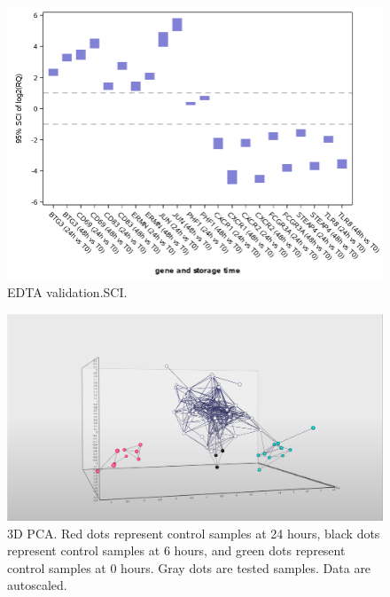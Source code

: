 \documentclass[fleqn,10pt]{wlscirep}
\begin{document}
\begin{figure}[ht]
    \centering
    \includegraphics[width=\linewidth]{figure4}
    \caption{EDTA validation.SCI.}
    \label{fig:figure4}
    \end{figure}

\begin{figure}[ht]
    \centering
    \includegraphics[width=\linewidth]{figure5}
    \caption{3D PCA. Red dots represent control samples at 24 hours, black dots represent control samples at 6 hours, and green dots represent control samples at 0 hours. Gray dots are tested samples. Data are autoscaled.}
    \label{fig:figure5}
    \end{figure}
\end{document}
